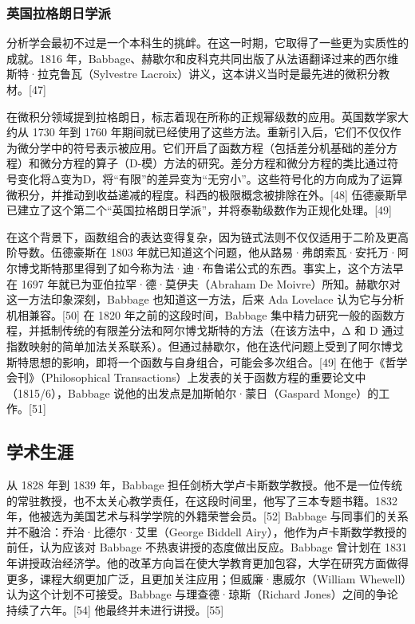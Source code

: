 \subsubsection{英国拉格朗日学派}
分析学会最初不过是一个本科生的挑衅。在这一时期，它取得了一些更为实质性的成就。1816 年，Babbage、赫歇尔和皮科克共同出版了从法语翻译过来的西尔维斯特·拉克鲁瓦（Sylvestre Lacroix）讲义，这本讲义当时是最先进的微积分教材。[47]

在微积分领域提到拉格朗日，标志着现在所称的正规幂级数的应用。英国数学家大约从 1730 年到 1760 年期间就已经使用了这些方法。重新引入后，它们不仅仅作为微分学中的符号表示被应用。它们开启了函数方程（包括差分机基础的差分方程）和微分方程的算子（D-模）方法的研究。差分方程和微分方程的类比通过符号变化将Δ变为D，将“有限”的差异变为“无穷小”。这些符号化的方向成为了运算微积分，并推动到收益递减的程度。科西的极限概念被排除在外。[48] 伍德豪斯早已建立了这个第二个“英国拉格朗日学派”，并将泰勒级数作为正规化处理。[49]

在这个背景下，函数组合的表达变得复杂，因为链式法则不仅仅适用于二阶及更高阶导数。伍德豪斯在 1803 年就已知道这个问题，他从路易·弗朗索瓦·安托万·阿尔博戈斯特那里得到了如今称为法·迪·布鲁诺公式的东西。事实上，这个方法早在 1697 年就已为亚伯拉罕·德·莫伊夫（Abraham De Moivre）所知。赫歇尔对这一方法印象深刻，Babbage 也知道这一方法，后来 Ada Lovelace 认为它与分析机相兼容。[50] 在 1820 年之前的这段时间，Babbage 集中精力研究一般的函数方程，并抵制传统的有限差分法和阿尔博戈斯特的方法（在该方法中，Δ 和 D 通过指数映射的简单加法关系联系）。但通过赫歇尔，他在迭代问题上受到了阿尔博戈斯特思想的影响，即将一个函数与自身组合，可能会多次组合。[49] 在他于《哲学会刊》（Philosophical Transactions）上发表的关于函数方程的重要论文中（1815/6），Babbage 说他的出发点是加斯帕尔·蒙日（Gaspard Monge）的工作。[51]
\subsection{学术生涯} 
从 1828 年到 1839 年，Babbage 担任剑桥大学卢卡斯数学教授。他不是一位传统的常驻教授，也不太关心教学责任，在这段时间里，他写了三本专题书籍。1832 年，他被选为美国艺术与科学学院的外籍荣誉会员。[52] Babbage 与同事们的关系并不融洽：乔治·比德尔·艾里（George Biddell Airy），他作为卢卡斯数学教授的前任，认为应该对 Babbage 不热衷讲授的态度做出反应。Babbage 曾计划在 1831 年讲授政治经济学。他的改革方向旨在使大学教育更加包容，大学在研究方面做得更多，课程大纲更加广泛，且更加关注应用；但威廉·惠威尔（William Whewell）认为这个计划不可接受。Babbage 与理查德·琼斯（Richard Jones）之间的争论持续了六年。[54] 他最终并未进行讲授。[55]


